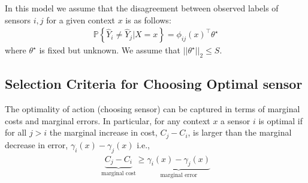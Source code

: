 In this model we assume that the disagreement between observed labels of sensors $i,j$ for a given context $x$ is as follows:
%
\begin{align}
\mathbb{P}\left\{\widehat{Y}_i \neq \widehat{Y}_j|X=x\right\} = {\phi_{ij}(x)^\top\theta^\star}
\end{align}
where $\theta^\star$ is fixed but unknown. We assume that $||{\theta}^\star||_2 \le S$.

\subsection{Selection Criteria for Choosing Optimal sensor} The optimality of action (choosing sensor) can be captured in terms of marginal costs and marginal errors. In particular, for any context $x$ a sensor $i$ is optimal if for all $j > i$ the marginal increase in cost, $C_j - C_i$, is larger than the marginal decrease in error, $\gamma_i(x)-\gamma_j(x)$ i.e.,
\begin{align}
\label{equ:lin_cost_err}
\underbrace{C_j - C_i}_{\text{marginal cost}} \ge  \underbrace{\gamma_i(x)-\gamma_j(x)}_{\text{marginal error}}
\end{align}

